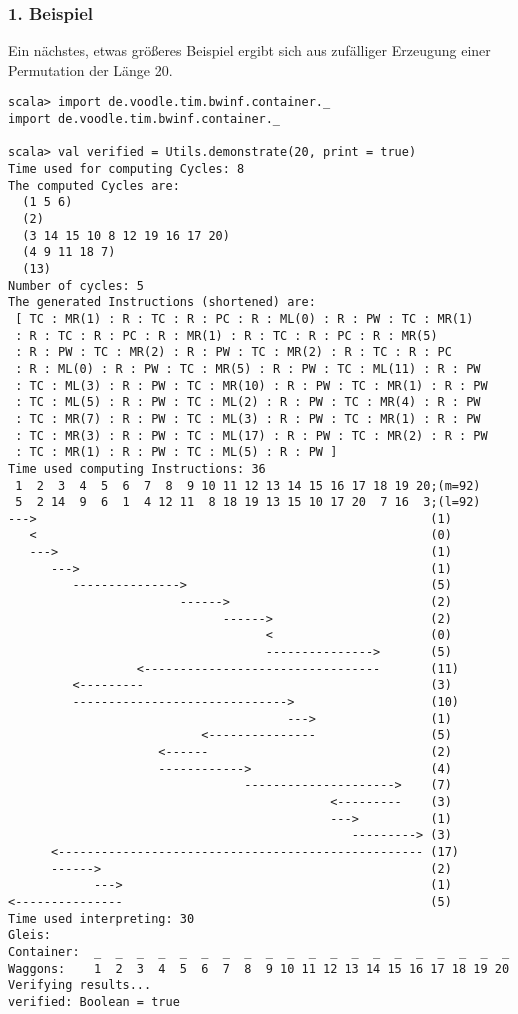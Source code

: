 \subsubsection*{1. Beispiel}
Ein nächstes, etwas größeres Beispiel ergibt sich aus zufälliger Erzeugung einer Permutation der Länge 20.
\lstset{basicstyle=\ttfamily}
\begin{lstlisting}
scala> import de.voodle.tim.bwinf.container._                                               
import de.voodle.tim.bwinf.container._

scala> val verified = Utils.demonstrate(20, print = true) 
Time used for computing Cycles: 8
The computed Cycles are: 
  (1 5 6)
  (2)
  (3 14 15 10 8 12 19 16 17 20)
  (4 9 11 18 7)
  (13)
Number of cycles: 5
The generated Instructions (shortened) are: 
 [ TC : MR(1) : R : TC : R : PC : R : ML(0) : R : PW : TC : MR(1)
 : R : TC : R : PC : R : MR(1) : R : TC : R : PC : R : MR(5)
 : R : PW : TC : MR(2) : R : PW : TC : MR(2) : R : TC : R : PC
 : R : ML(0) : R : PW : TC : MR(5) : R : PW : TC : ML(11) : R : PW
 : TC : ML(3) : R : PW : TC : MR(10) : R : PW : TC : MR(1) : R : PW
 : TC : ML(5) : R : PW : TC : ML(2) : R : PW : TC : MR(4) : R : PW
 : TC : MR(7) : R : PW : TC : ML(3) : R : PW : TC : MR(1) : R : PW
 : TC : MR(3) : R : PW : TC : ML(17) : R : PW : TC : MR(2) : R : PW
 : TC : MR(1) : R : PW : TC : ML(5) : R : PW ] 
Time used computing Instructions: 36
 1  2  3  4  5  6  7  8  9 10 11 12 13 14 15 16 17 18 19 20;(m=92)
 5  2 14  9  6  1  4 12 11  8 18 19 13 15 10 17 20  7 16  3;(l=92)
--->                                                       (1)
   <                                                       (0)
   --->                                                    (1)
      --->                                                 (1)
         --------------->                                  (5)
                        ------>                            (2)
                              ------>                      (2)
                                    <                      (0)
                                    --------------->       (5)
                  <---------------------------------       (11)
         <---------                                        (3)
         ------------------------------>                   (10)
                                       --->                (1)
                           <---------------                (5)
                     <------                               (2)
                     ------------>                         (4)
                                 --------------------->    (7)
                                             <---------    (3)
                                             --->          (1)
                                                ---------> (3)
      <--------------------------------------------------- (17)
      ------>                                              (2)
            --->                                           (1)
<---------------                                           (5)
Time used interpreting: 30
Gleis: 
Container:  _  _  _  _  _  _  _  _  _  _  _  _  _  _  _  _  _  _  _  _
Waggons:    1  2  3  4  5  6  7  8  9 10 11 12 13 14 15 16 17 18 19 20
Verifying results...
verified: Boolean = true
\end{lstlisting}
